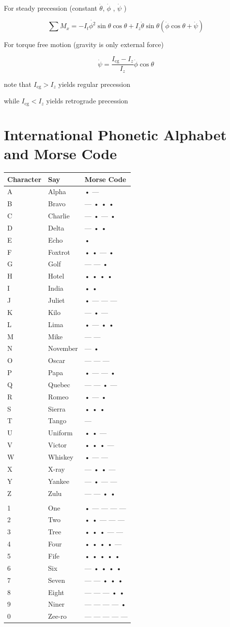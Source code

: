 \documentclass[
]{book}
\begin{document}
For steady precession (constant \(\dot{\theta}\), \(\dot{\phi}\) , \(\dot{\psi}\) )

\[ \sum M_{x} = - I_{t}\dot{\phi^{2}}\sin\theta\cos\theta + I_{z}\dot{\theta}\sin\theta\left( \dot{\phi}\cos\theta + \dot{\psi} \right) \]

For torque free motion (gravity is only external force)

\[\dot{\psi} = \frac{I_{\mathrm{cg}} - I_{z}}{I_{z}}\dot{\phi}\cos\theta\]

note that \(I_{\mathrm{cg}} > I_z\) yields regular precession

while \(I_{\mathrm{cg}} < I_z\) yields retrograde precession

\hypertarget{international-phonetic-alphabet-and-morse-code}{%
\section{International Phonetic Alphabet and Morse Code}\label{international-phonetic-alphabet-and-morse-code}}

\begin{longtable}[]{@{}lll@{}}
\toprule
Character & Say & Morse Code\tabularnewline
\midrule
\endhead
A & Alpha & • ---\tabularnewline
B & Bravo & --- • • •\tabularnewline
C & Charlie & --- • --- •\tabularnewline
D & Delta & --- • •\tabularnewline
E & Echo & •\tabularnewline
F & Foxtrot & • • --- •\tabularnewline
G & Golf & --- --- •\tabularnewline
H & Hotel & • • • •\tabularnewline
I & India & • •\tabularnewline
J & Juliet & • --- --- ---\tabularnewline
K & Kilo & --- • ---\tabularnewline
L & Lima & • --- • •\tabularnewline
M & Mike & --- ---\tabularnewline
N & November & --- •\tabularnewline
O & Oscar & --- --- ---\tabularnewline
P & Papa & • --- --- •\tabularnewline
Q & Quebec & --- --- • ---\tabularnewline
R & Romeo & • --- •\tabularnewline
S & Sierra & • • •\tabularnewline
T & Tango & ---\tabularnewline
U & Uniform & • • ---\tabularnewline
V & Victor & • • • ---\tabularnewline
W & Whiskey & • --- ---\tabularnewline
X & X-ray & --- • • ---\tabularnewline
Y & Yankee & --- • --- ---\tabularnewline
Z & Zulu & --- --- • •\tabularnewline
& &\tabularnewline
1 & One & • --- --- --- ---\tabularnewline
2 & Two & • • --- --- ---\tabularnewline
3 & Tree & • • • --- ---\tabularnewline
4 & Four & • • • • ---\tabularnewline
5 & Fife & • • • • •\tabularnewline
6 & Six & --- • • • •\tabularnewline
7 & Seven & --- --- • • •\tabularnewline
8 & Eight & --- --- --- • •\tabularnewline
9 & Niner & --- --- --- --- •\tabularnewline
0 & Zee-ro & --- --- --- --- ---\tabularnewline
\bottomrule
\end{longtable}
\end{document}
